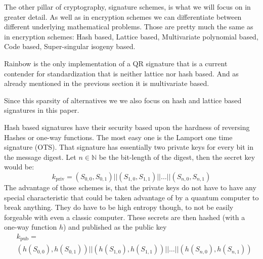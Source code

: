 \documentclass[conference]{IEEEtran}
\begin{document}
The other pillar of cryptography, signature schemes, is what we will focus on in greater detail.
As well as in encryption schemes we can differentiate between different underlying mathematical problems. Those are pretty much the same as in encryption schemes: 
Hash based,
Lattice based,
Multivariate polynomial based,
Code based,
Super-singular isogeny based.\cite{QR_sigs}

Rainbow is the only implementation of a QR signature that is a current contender for standardization that is neither lattice nor hash based.
And as already mentioned in the previous section it is multivariate based.

Since this sparsity of alternatives we we also focus on hash and lattice based signatures in this paper.

Hash based signatures have their security based upon the hardness of reversing Hashes or one-way functions.
The most easy one is the Lamport one time signature (OTS).\cite{QR_algs} 
That signature has essentially two private keys for every bit in the message digest. 
Let $n \in \mathbb{N}$ be the bit-length of the digest, then the secret key would be: \[k_\text{priv}= (S_{0,0},S_{0,1}) || (S_{1,0},S_{1,1})|| \dots || (S_{n,0},S_{n,1})\]
The advantage of those schemes is, that the private keys do not have to have any special characteristic that could be taken advantage of by a quantum computer to break anything.
They do have to be high entropy though, to not be easily forgeable with even a classic computer. 
These secrets are then hashed (with a one-way function $h$) and published as the public key \begin{align*}
    &k_\text{pub}= \\ &(h(S_{0,0}),h(S_{0,1})) || (h(S_{1,0}),h(S_{1,1}))|| \dots || (h(S_{n,0}),h(S_{n,1}))
\end{align*}
\end{document}
